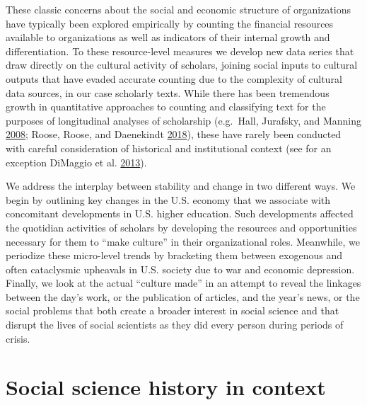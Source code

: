 \documentclass[]{book}
\theoremstyle{definition}
\theoremstyle{definition}
\theoremstyle{definition}
\theoremstyle{remark}
\begin{document}
These classic concerns about the social and economic structure of
organizations have typically been explored empirically by counting the
financial resources available to organizations as well as indicators of
their internal growth and differentiation. To these resource-level
measures we develop new data series that draw directly on the cultural
activity of scholars, joining social inputs to cultural outputs that
have evaded accurate counting due to the complexity of cultural data
sources, in our case scholarly texts. While there has been tremendous
growth in quantitative approaches to counting and classifying text for
the purposes of longitudinal analyses of scholarship (e.g.~Hall,
Jurafsky, and Manning \protect\hyperlink{ref-Hall2008Studying}{2008};
Roose, Roose, and Daenekindt
\protect\hyperlink{ref-Roose2018Trends}{2018}), these have rarely been
conducted with careful consideration of historical and institutional
context (see for an exception DiMaggio et al.
\protect\hyperlink{ref-DiMaggio2013Exploiting}{2013}).

We address the interplay between stability and change in two different
ways. We begin by outlining key changes in the U.S. economy that we
associate with concomitant developments in U.S. higher education. Such
developments affected the quotidian activities of scholars by developing
the resources and opportunities necessary for them to ``make culture''
in their organizational roles. Meanwhile, we periodize these micro-level
trends by bracketing them between exogenous and often cataclysmic
upheavals in U.S. society due to war and economic depression. Finally,
we look at the actual ``culture made'' in an attempt to reveal the
linkages between the day's work, or the publication of articles, and the
year's news, or the social problems that both create a broader interest
in social science and that disrupt the lives of social scientists as
they did every person during periods of crisis.

\hypertarget{social-science-history-in-context}{%
\section{\texorpdfstring{ Social science history in
context}{ Social science history in context}}\label{social-science-history-in-context}}
\end{document}
